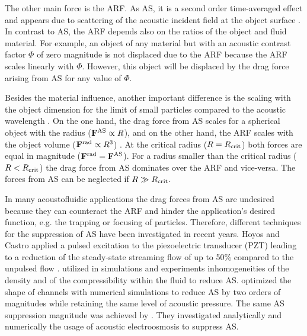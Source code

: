 The other main force is the ARF. As AS, it is a second order time-averaged 
effect and appears due to scattering of the acoustic incident field at the 
object surface \cite{Yosioka1955,Bruus2012,Gorkov1962}. In contrast to AS, the 
ARF depends also on the ratios of the object and fluid material. For example, 
an object of any material but with an acoustic contrast factor $\Phi$ 
\cite{Bruus2012} of zero magnitude is not displaced due to the ARF because the 
ARF scales linearly with $\Phi$. However, this object will be displaced by the 
drag force arising from AS for any value of $\Phi$.

Besides the material influence, another important difference is the scaling 
with the object dimension for the limit of small particles compared to the 
acoustic wavelength \cite{Bruus2012,King1934}. On the one hand, the drag force 
from AS scales for a spherical object with the radius ($\vb{F}^{\mathrm{AS}}\propto R$), and 
on the other hand, the ARF scales with the object volume ($\vb{F}^{\mathrm{rad}}\propto 
R^{3}$) \cite{Bruus2012}. At the critical radius ($R=R_{\mathrm{crit}}$) both forces are 
equal in magnitude ($\vb{F}^{\mathrm{rad}}=\vb{F}^{\mathrm{AS}}$). For a radius smaller than the critical 
radius ($R<R_{\mathrm{crit}}$) \cite{Bruus2012,Barnkob2012} the drag force from AS 
dominates over the ARF and vice-versa. The forces from AS can be neglected if 
$R\gg R_{\mathrm{crit}}$.

In many acoustofluidic applications the drag forces from AS are undesired 
because they can counteract the ARF \cite{VanAssche2020,Antfolk2014} and hinder 
the application's desired function, e.g. the trapping or focusing of particles. 
Therefore, different techniques for the suppression of AS have been 
investigated in recent years. Hoyos and Castro applied a pulsed excitation to 
the piezoelectric transducer (PZT) leading to a reduction of the steady-state 
streaming flow of up to 50\% compared to the unpulsed flow 
\cite{Hoyos2013,Castro2016}.   utilized in simulations and 
experiments inhomogeneities of the density and of the compressibility within 
the fluid to reduce AS.  optimized the shape of channels with 
numerical simulations to reduce AS by two orders of magnitudes while retaining 
the same level of acoustic pressure. The same AS suppression magnitude was 
achieved by . They investigated analytically and 
numerically the usage of acoustic electroosmosis to suppress AS.

